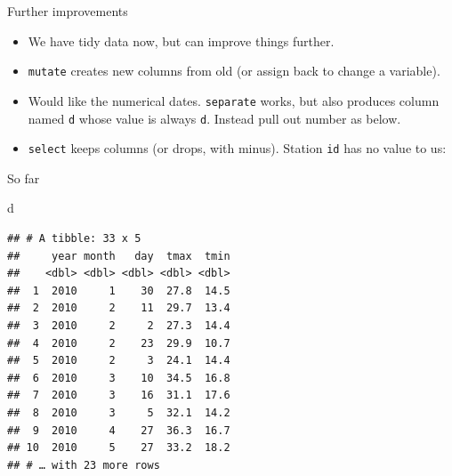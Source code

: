 \documentclass[ignorenonframetext,]{beamer}
\newenvironment{Shaded}{\begin{snugshade}}{\end{snugshade}}
\newcommand{\DataTypeTok}[1]{\textcolor[rgb]{0.13,0.29,0.53}{#1}}
\newcommand{\KeywordTok}[1]{\textcolor[rgb]{0.13,0.29,0.53}{\textbf{#1}}}
\newcommand{\NormalTok}[1]{#1}
\newcommand{\OperatorTok}[1]{\textcolor[rgb]{0.81,0.36,0.00}{\textbf{#1}}}
\newcommand{\StringTok}[1]{\textcolor[rgb]{0.31,0.60,0.02}{#1}}
\providecommand{\tightlist}{%
  \setlength{\itemsep}{0pt}\setlength{\parskip}{0pt}}
\begin{document}
\begin{frame}[fragile]{Further improvements}
\protect\hypertarget{further-improvements}{}

\begin{itemize}
\tightlist
\item
  We have tidy data now, but can improve things further.
\item
  \texttt{mutate} creates new columns from old (or assign back to change
  a variable).
\item
  Would like the numerical dates. \texttt{separate} works, but also
  produces column named \texttt{d} whose value is always \texttt{d}.
  Instead pull out number as below.
\item
  \texttt{select} keeps columns (or drops, with minus). Station
  \texttt{id} has no value to us:
\end{itemize}

\begin{Shaded}
\end{Shaded}

\end{frame}

\begin{frame}[fragile]{So far}
\protect\hypertarget{so-far-2}{}

\begin{Shaded}
\begin{Highlighting}[]
\NormalTok{d}
\end{Highlighting}
\end{Shaded}

\begin{verbatim}
## # A tibble: 33 x 5
##     year month   day  tmax  tmin
##    <dbl> <dbl> <dbl> <dbl> <dbl>
##  1  2010     1    30  27.8  14.5
##  2  2010     2    11  29.7  13.4
##  3  2010     2     2  27.3  14.4
##  4  2010     2    23  29.9  10.7
##  5  2010     2     3  24.1  14.4
##  6  2010     3    10  34.5  16.8
##  7  2010     3    16  31.1  17.6
##  8  2010     3     5  32.1  14.2
##  9  2010     4    27  36.3  16.7
## 10  2010     5    27  33.2  18.2
## # … with 23 more rows
\end{verbatim}

\end{frame}
\end{document}
